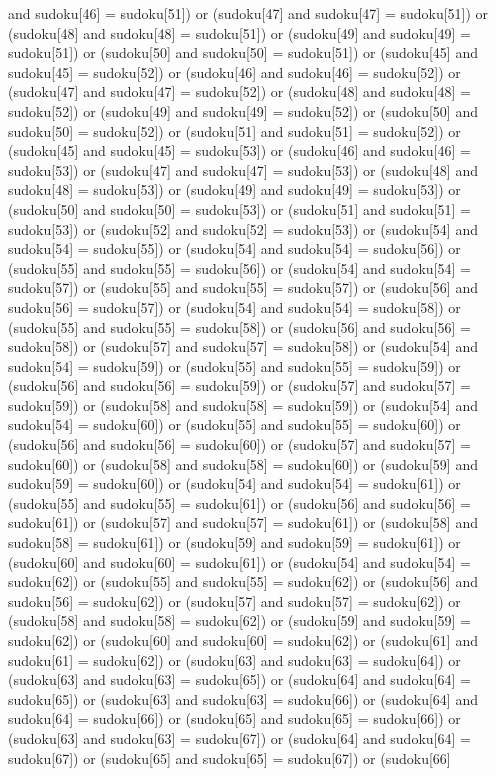 \documentclass[8pt]{article}
\begin{document}
\begin{algorithm}[H]
and sudoku[46] = sudoku[51]) or (sudoku[47]  and sudoku[47] = sudoku[51]) or (sudoku[48]  and sudoku[48] = sudoku[51]) or (sudoku[49]  and sudoku[49] = sudoku[51]) or (sudoku[50]  and sudoku[50] = sudoku[51]) or (sudoku[45]  and sudoku[45] = sudoku[52]) or (sudoku[46]  and sudoku[46] = sudoku[52]) or (sudoku[47]  and sudoku[47] = sudoku[52]) or (sudoku[48]  and sudoku[48] = sudoku[52]) or (sudoku[49]  and sudoku[49] = sudoku[52]) or (sudoku[50]  and sudoku[50] = sudoku[52]) or (sudoku[51]  and sudoku[51] = sudoku[52]) or (sudoku[45]  and sudoku[45] = sudoku[53]) or (sudoku[46]  and sudoku[46] = sudoku[53]) or (sudoku[47]  and sudoku[47] = sudoku[53]) or (sudoku[48]  and sudoku[48] = sudoku[53]) or (sudoku[49]  and sudoku[49] = sudoku[53]) or (sudoku[50]  and sudoku[50] = sudoku[53]) or (sudoku[51]  and sudoku[51] = sudoku[53]) or (sudoku[52]  and sudoku[52] = sudoku[53]) or (sudoku[54]  and sudoku[54] = sudoku[55]) or (sudoku[54]  and sudoku[54] = sudoku[56]) or (sudoku[55]  and sudoku[55] = sudoku[56]) or (sudoku[54]  and sudoku[54] = sudoku[57]) or (sudoku[55]  and sudoku[55] = sudoku[57]) or (sudoku[56]  and sudoku[56] = sudoku[57]) or (sudoku[54]  and sudoku[54] = sudoku[58]) or (sudoku[55]  and sudoku[55] = sudoku[58]) or (sudoku[56]  and sudoku[56] = sudoku[58]) or (sudoku[57]  and sudoku[57] = sudoku[58]) or (sudoku[54]  and sudoku[54] = sudoku[59]) or (sudoku[55]  and sudoku[55] = sudoku[59]) or (sudoku[56]  and sudoku[56] = sudoku[59]) or (sudoku[57]  and sudoku[57] = sudoku[59]) or (sudoku[58]  and sudoku[58] = sudoku[59]) or (sudoku[54]  and sudoku[54] = sudoku[60]) or (sudoku[55]  and sudoku[55] = sudoku[60]) or (sudoku[56]  and sudoku[56] = sudoku[60]) or (sudoku[57]  and sudoku[57] = sudoku[60]) or (sudoku[58]  and sudoku[58] = sudoku[60]) or (sudoku[59]  and sudoku[59] = sudoku[60]) or (sudoku[54]  and sudoku[54] = sudoku[61]) or (sudoku[55]  and sudoku[55] = sudoku[61]) or (sudoku[56]  and sudoku[56] = sudoku[61]) or (sudoku[57]  and sudoku[57] = sudoku[61]) or (sudoku[58]  and sudoku[58] = sudoku[61]) or (sudoku[59]  and sudoku[59] = sudoku[61]) or (sudoku[60]  and sudoku[60] = sudoku[61]) or (sudoku[54]  and sudoku[54] = sudoku[62]) or (sudoku[55]  and sudoku[55] = sudoku[62]) or (sudoku[56]  and sudoku[56] = sudoku[62]) or (sudoku[57]  and sudoku[57] = sudoku[62]) or (sudoku[58]  and sudoku[58] = sudoku[62]) or (sudoku[59]  and sudoku[59] = sudoku[62]) or (sudoku[60]  and sudoku[60] = sudoku[62]) or (sudoku[61]  and sudoku[61] = sudoku[62]) or (sudoku[63]  and sudoku[63] = sudoku[64]) or (sudoku[63]  and sudoku[63] = sudoku[65]) or (sudoku[64]  and sudoku[64] = sudoku[65]) or (sudoku[63]  and sudoku[63] = sudoku[66]) or (sudoku[64]  and sudoku[64] = sudoku[66]) or (sudoku[65]  and sudoku[65] = sudoku[66]) or (sudoku[63]  and sudoku[63] = sudoku[67]) or (sudoku[64]  and sudoku[64] = sudoku[67]) or (sudoku[65]  and sudoku[65] = sudoku[67]) or (sudoku[66]  
\end{algorithm}
\end{document}
